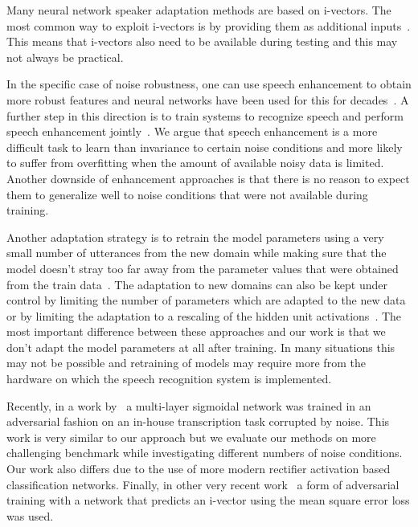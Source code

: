 \documentclass[a4paper]{article}
\begin{document}
    Many neural network speaker adaptation methods are based on
    i-vectors. The most common way to exploit i-vectors is by providing them as additional
    inputs~\citep{senior2014improving,saon2013speaker}. This means that i-vectors also need to
    be available during testing and this may not always be practical.

    In the specific case of noise robustness, one can use speech enhancement to
    obtain more robust features and neural networks have been used for this for
    decades~\citep{knecht1995neural}. A further step in this direction is to train
    systems to recognize speech and perform speech enhancement jointly~\citep{narayanan2014joint}. 
    We argue that speech enhancement is a more difficult task to learn than
    invariance to certain noise conditions and more likely to suffer from
    overfitting when the amount of available noisy data is limited.
    Another downside of enhancement approaches is that there is no reason to
    expect them to generalize well to noise conditions that were not available during
    training.

    Another adaptation strategy is to retrain the model parameters using a very small
    number of utterances from the new domain while making sure that the model
    doesn't stray too far away from the parameter values that were obtained from
    the train data~\citep{yu2013kl}.
    The adaptation to new domains can also be kept under control by limiting
    the number of parameters which are adapted to the new data or by limiting the
    adaptation to a rescaling of the hidden unit activations~\citep{swietojanski2014learning}.
    The most important difference between these approaches and our work is that
    we don't adapt the model parameters at all after training. In many
    situations this may not be possible and retraining of models may require more
    from the hardware on which the speech recognition system is implemented.

    Recently, in a work by~\cite{yusuke2016adversarial} a multi-layer sigmoidal network was trained 
    in an adversarial fashion on an in-house transcription task corrupted by noise.
    This work is very similar to our approach but we evaluate our methods on
    more challenging benchmark while investigating different numbers of noise
    conditions. Our work also differs due to the use of more modern rectifier
    activation based classification networks.
    Finally, in other very recent work~\citep{saon2017english} a form of adversarial training with a network
    that predicts an i-vector using the mean square error loss was used.
\end{document}
